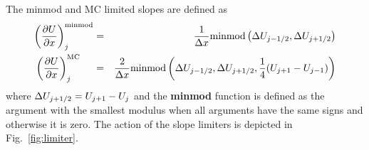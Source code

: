 The minmod and MC limited slopes are defined as
\begin{eqnarray}
   \left(\frac{\partial U}{\partial x}\right)^{\rm minmod}_j &=& 
   \frac{1}{\Delta x}\mathrm{minmod}\left(\Delta U_{j-1/2},\Delta U_{j+1/2}\right) 
\label{q-limiter} \\
   \left(\frac{\partial U}{\partial x}\right)^{\rm MC}_j~~~~ &=&
  \frac{2}{\Delta x}\mathrm{minmod}\left(\Delta U_{j-1/2},\Delta U_{j+1/2}, 
           \frac14(U_{j+1}-U_{j-1})\right)
\nonumber
\end{eqnarray}
where $\Delta U_{j+1/2}=U_{j+1}-U_j$ and the {\bf minmod} 
function is defined as the argument with the smallest modulus 
when all arguments have the same signs and otherwise it is zero.
The action of the slope limiters is depicted in Fig.~\ref{fig:limiter}.


%



